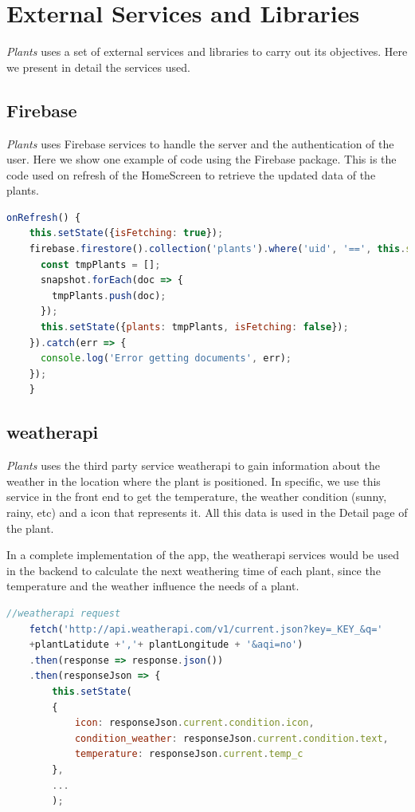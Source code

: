 \documentclass[10pt]{article}
\begin{document}
	\section{External Services and Libraries}
	\textit{Plants} uses a set of external services and libraries to carry out its objectives. Here we present in detail the services used.
	
	\subsection{Firebase}
	\textit{Plants} uses Firebase services to handle the server and the authentication of the user. Here we show one example of code using the Firebase package. This is the code used on refresh of the HomeScreen to retrieve the updated data of the plants.
	\begin{lstlisting}[language=JavaScript]
    onRefresh() {
    this.setState({isFetching: true});
    firebase.firestore().collection('plants').where('uid', '==', this.state.user.uid).get().then(snapshot => {
      const tmpPlants = [];
      snapshot.forEach(doc => {
        tmpPlants.push(doc);
      });
      this.setState({plants: tmpPlants, isFetching: false});
    }).catch(err => {
      console.log('Error getting documents', err);
    });
    }
	\end{lstlisting}
	\subsection{weatherapi}
	
	\textit{Plants} uses the third party service weatherapi to gain information about the weather in the location where the plant is positioned. In specific, we use this service in the front end to get the temperature, the weather condition (sunny, rainy, etc) and a icon that represents it. All this data is used in the Detail page of the plant. 
	
	In a complete implementation of the app, the weatherapi services would be used in the backend to calculate the next weathering time of each plant, since the temperature and the weather influence the needs of a plant.
	
	\begin{lstlisting}[language=JavaScript]
    //weatherapi request
    fetch('http://api.weatherapi.com/v1/current.json?key=_KEY_&q='
    +plantLatidute +','+ plantLongitude + '&aqi=no')
    .then(response => response.json())
    .then(responseJson => {
        this.setState(
        {
            icon: responseJson.current.condition.icon,
            condition_weather: responseJson.current.condition.text,
            temperature: responseJson.current.temp_c
        },
        ...
        );
	\end{lstlisting}
	
\end{document}
